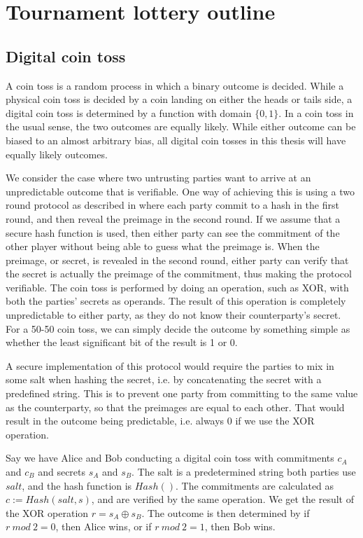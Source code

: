 \section{Tournament lottery outline}
\label{sec:outline}

\subsection{Digital coin toss}

A coin toss is a random process in which a binary outcome is decided. While a physical coin toss is decided by a coin landing on either the heads or tails side, a digital coin toss is determined by a function with domain $\{0, 1\}$. In a coin toss in the usual sense, the two outcomes are equally likely. While either outcome can be biased to an almost arbitrary bias, all digital coin tosses in this thesis will have equally likely outcomes.

We consider the case where two untrusting parties want to arrive at an unpredictable outcome that is verifiable. One way of achieving this is using a two round protocol as described in \cite{blum1983coin} where each party commit to a hash in the first round, and then reveal the preimage in the second round. If we assume that a secure hash function is used, then either party can see the commitment of the other player without being able to guess what the preimage is. When the preimage, or secret, is revealed in the second round, either party can verify that the secret is actually the preimage of the commitment, thus making the protocol verifiable. The coin toss is performed by doing an operation, such as XOR, with both the parties' secrets as operands. The result of this operation is completely unpredictable to either party, as they do not know their counterparty's secret. For a 50-50 coin toss, we can simply decide the outcome by something simple as whether the least significant bit of the result is 1 or 0.

A secure implementation of this protocol would require the parties to mix in some salt when hashing the secret, i.e. by concatenating the secret with a predefined string. This is to prevent one party from committing to the same value as the counterparty, so that the preimages are equal to each other. That would result in the outcome being predictable, i.e. always $0$ if we use the XOR operation. 

Say we have Alice and Bob conducting a digital coin toss with commitments $c_A$ and $c_B$ and secrets $s_A$ and $s_B$. The salt is a predetermined string both parties use $salt$, and the hash function is $Hash()$. The commitments are calculated as $c:=Hash(salt, s)$, and are verified by the same operation. We get the result of the XOR operation $r=s_A \oplus s_B$. The outcome is then determined by if $r\ mod\ 2 = 0$, then Alice wins, or if $r\ mod\ 2 = 1$, then Bob wins.

